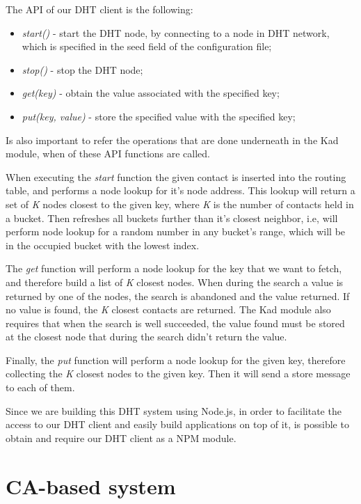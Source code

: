 The \ac{API} of our DHT client is the following:

\begin{itemize}
  \item \textit{start()} - start the DHT node, by connecting to a node in DHT network, which is specified in the seed field of the configuration file;
  \item \textit{stop()} - stop the DHT node;
  \item \textit{get(key)} - obtain the value associated with the specified key;
  \item \textit{put(key, value)} - store the specified value with the specified key;
\end{itemize}

Is also important to refer the operations that are done underneath in the Kad module, when of these API functions are called.

When executing the \textit{start} function the given contact is inserted into the routing table, and performs a node lookup for it's node address.
This lookup will return a set of \textit{K} nodes closest to the given key, where \textit{K} is the number of contacts held in a bucket.
Then refreshes all buckets further than it's closest neighbor, i.e, will perform node lookup for a random number in any bucket's range, which will be in the occupied bucket with the lowest index.

The \textit{get} function will perform a node lookup for the key that we want to fetch, and therefore build a list of \textit{K} closest nodes.
When during the search a value is returned by one of the nodes, the search is abandoned and the value returned.
If no value is found,  the \textit{K} closest contacts are returned.
The Kad module also requires that when the search is well succeeded, the value found must be stored at the closest node that during the search didn't return the value.

Finally, the \textit{put} function will perform a node lookup for the given key, therefore collecting the \textit{K} closest nodes to the given key.
Then it will send a store message to each of them.

Since we are building this DHT system using Node.js, in order to facilitate the access to our DHT client and easily build applications on top of it, is possible to obtain and require our DHT client as a \ac{NPM} module.

\section{CA-based system}\label{implementation:ca-based}

